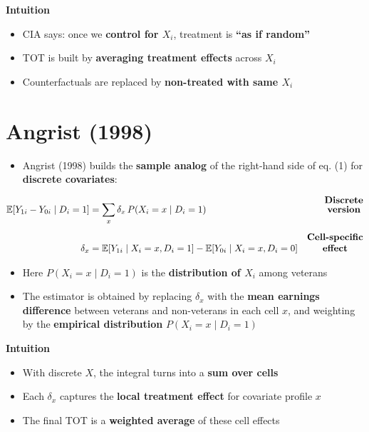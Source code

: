 \documentclass[12pt]{article}
\begin{document}
\textbf{Intuition}
\begin{itemize}
    \item CIA says: once we \textbf{control for \(X_i\)}, treatment is \textbf{“as if random”}
    \item TOT is built by \textbf{averaging treatment effects} across \(X_i\)
    \item Counterfactuals are replaced by \textbf{non-treated with same \(X_i\)}
\end{itemize}

\section*{\noindent\textbf{Angrist (1998)}}

\begin{itemize}
    \item Angrist (1998) builds the \textbf{sample analog} of the right-hand side of eq. (1) for \textbf{discrete covariates}:
\end{itemize}

\singlespacing
\begin{align}
\mathbb{E}[Y_{1i} - Y_{0i} \mid D_i = 1] 
   &= \sum_x \delta_x \, P(X_i = x \mid D_i=1) 
   & \text{\textbf{\shortstack{Discrete \\ version}}} \\[6pt]
\delta_x 
   &= \mathbb{E}[Y_{1i} \mid X_i = x, D_i=1] - \mathbb{E}[Y_{0i} \mid X_i = x, D_i=0] 
   & \text{\textbf{\shortstack{Cell-specific \\ effect}}}
\end{align}

\begin{itemize}
    \item Here \(P(X_i = x \mid D_i = 1)\) is the \textbf{distribution of \(X_i\)} among veterans
    \item The estimator is obtained by replacing \(\delta_x\) with the \textbf{mean earnings difference} between veterans and non-veterans in each cell \(x\), and weighting by the \textbf{empirical distribution} \(P(X_i = x \mid D_i=1)\)
\end{itemize}

\textbf{Intuition}
\begin{itemize}
    \item With discrete \(X\), the integral turns into a \textbf{sum over cells}
    \item Each \(\delta_x\) captures the \textbf{local treatment effect} for covariate profile \(x\)
    \item The final TOT is a \textbf{weighted average} of these cell effects
\end{itemize}
\end{document}
